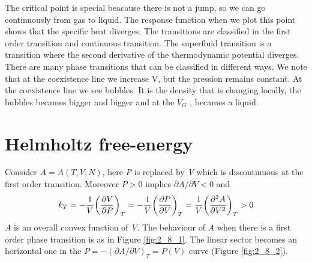\documentclass[../main/main.tex]{subfiles}
\begin{document}
The critical point is special beacause there is not a jump, so we can go continuously from gas to liquid. The response function when we plot this point shows that the specific heat diverges.
The transitions are classified in the first order transition and continuous transition. The superfluid transition is a transition where the second derivative of the thermodynamic potential diverges. There are many phase transitions that can be classified in different ways.
We note that at the coexistence line we increase V, but the pression remains constant. At the coexistence line we see bubbles. It is the density that is changing locally, the bubbles becames bigger and bigger and at the \( V_G \) , becames a liquid.


\section{Helmholtz free-energy}
Consider \( A = A (T,V,N) \), here \emph{P} is replaced by \emph{V} which is discontinuous at the first order transition. Moreover \( P > 0 \)  implies \( \partial{A}/\partial{V} < 0   \) and
\begin{equation}
  k_T = -\frac{1}{V} \qty(\pdv{V}{P} )_T = -\frac{1}{V} \qty(\pdv{P}{V} )_T = \frac{1}{V} \qty(\pdv[2]{A}{V} )_T > 0
  \label{eq:}
\end{equation}
\emph{A} is an overall convex function of \emph{V}.
The behaviour of \emph{A} when there is a first order phase transition is as in Figure \ref{fig:2_8_1}. The linear sector becomes an horizontal one in the \( P = - (\partial{A}/\partial{V}  )_T = P (V) \) curve (Figure \ref{fig:2_8_2}).
\end{document}
